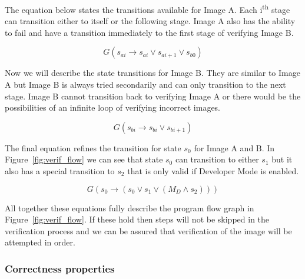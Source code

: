 \documentclass[../report.tex]{subfiles}
\begin{document}
The equation below states the transitions available for Image A.
Each i\textsuperscript{th} stage can transition either to itself or the following stage.
Image A also has the ability to fail and have a transition immediately to the first stage of verifying Image B.

\begin{equation}
    G(s_{ai} \to s_{ai} \lor s_{ai+1} \lor s_{b0})
\end{equation}

Now we will describe the state transitions for Image B. 
They are similar to Image A but Image B is always tried secondarily and can only transition to the next stage. 
Image B cannot transition back to verifying Image A or there would be the possibilities of an infinite loop of verifying incorrect images.

\begin{equation}
    G(s_{bi} \to s_{bi} \lor s_{bi+1})
\end{equation}

The final equation refines the transition for state $s_0$ for Image A and B.
In Figure~\ref{fig:verif_flow} we can see that state $s_0$ can transition to either $s_1$ but it also has a special transition to $s_2$ that is only valid if Developer Mode is enabled.

\begin{equation}
    G(s_0 \to (s_0 \lor s_{1} \lor (M_D \land s_{2})))
\end{equation}

All together these equations fully describe the program flow graph in Figure~\ref{fig:verif_flow}. 
If these hold then steps will not be skipped in the verification process and we can be assured that verification of the image will be attempted in order.



\subsubsection{Correctness properties}
\end{document}
